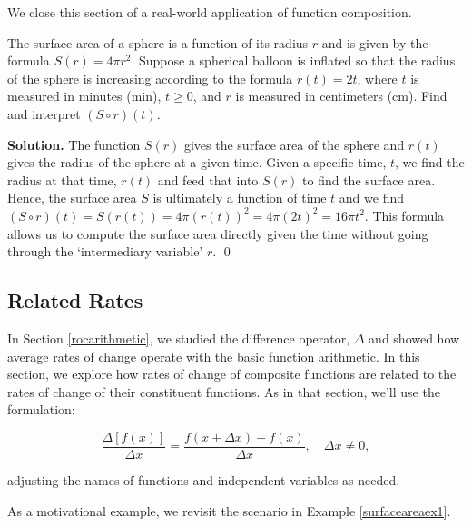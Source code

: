 \documentclass{ximera}
\begin{document}
We close this section of a real-world application of function composition.

\begin{example}\label{surfaceareaex1}  The surface area of a sphere is a function of its radius $r$ and is given by the formula $S(r) = 4 \pi r^2$.    Suppose a spherical balloon is inflated so that the radius of the sphere is increasing according to the formula $r(t) = 2t$, where $t$ is measured in minutes (min), $t \geq 0$, and $r$ is measured in centimeters (cm).  Find and interpret $(S \circ r)(t)$.

\medskip

{\bf Solution.}  The function  $S(r)$ gives the surface area of the sphere and $r(t)$ gives the radius of the sphere at a given time.    Given a specific time, $t$, we find the radius at that time, $r(t)$ and feed that into $S(r)$ to find the surface area. Hence,  the surface area $S$ is ultimately a function of time $t$ and we find $(S \circ r)(t) = S(r(t)) = 4 \pi (r(t))^2 = 4 \pi \left(2t\right)^2 = 16 \pi t^{2}$.  This formula allows us to compute the surface area directly given the time without going through the `intermediary variable' $r$. \qed

\end{example}

\subsection{Related Rates}
\label{RelatedRates}

In Section \ref{rocarithmetic}, we studied the difference operator, $\Delta$ and showed how average rates of change operate with the basic function arithmetic.  In this section, we explore how rates of change of composite functions are related to the rates of change of their constituent functions. As in that section, we'll use the formulation:

\[ \dfrac{\Delta[f(x)]}{\Delta x} = \dfrac{f(x+\Delta x)-f(x)}{\Delta x}, \quad \Delta x \neq 0,\]

 adjusting the names of functions and independent variables as needed. 
 
 
 \medskip
 
 As a motivational example, we revisit the scenario in  Example \ref{surfaceareaex1}.

\medskip
\end{document}

